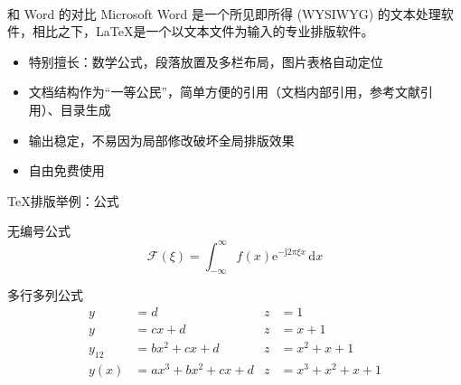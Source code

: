 \begin{frame}{和 Word 的对比}
  Microsoft\textsuperscript{\textregistered}  Word 是一个所见即所得 (WYSIWYG) 的文本处理软件，相比之下，\LaTeX 是一个以文本文件为输入的专业排版软件。

  \begin{itemize}
    \item 特别擅长：数学公式，段落放置及多栏布局，图片表格自动定位
    \item 文档结构作为“一等公民”，简单方便的引用（文档内部引用，参考文献引用）、目录生成
    \item 输出稳定，不易因为局部修改破坏全局排版效果
    \item 自由免费使用
  \end{itemize}
\end{frame}

\begin{frame}{\TeX{}排版举例：公式}
  \begin{exampleblock}{无编号公式}
    \begin{equation*}
      \mathcal{F}(\xi)=\int_{-\infty}^{\infty} f(x)\mathrm{e}^{-\mathrm{j}2\pi \xi x}\,\mathrm{d}x
    \end{equation*}
  \end{exampleblock}
  \begin{exampleblock}{多行多列公式}
    \begin{align}
      y & =d & z & =1\\
      y & =cx+d & z & =x+1\\
      y_{12} & =bx^{2}+cx+d & z & =x^{2}+x+1\nonumber \\
      y(x) & =ax^{3}+bx^{2}+cx+d & z & =x^{3}+x^{2}+x+1
    \end{align}
  \end{exampleblock}
\end{frame}


